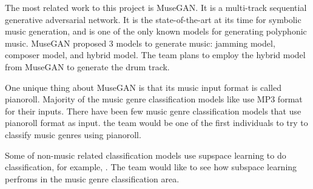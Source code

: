 \begin{par}
    \par\hspace{15pt} The most related work to this project is MuseGAN.\cite{musegan} It is a multi-track sequential generative adversarial network. It is the state-of-the-art at its time for symbolic music generation, and is one of the only known models for generating polyphonic music. MuseGAN proposed 3 models to generate music: jamming model, composer model, and hybrid model. The team plans to employ the hybrid model from MuseGAN to generate the drum track. 
\end{par}

\begin{par}
    \par One unique thing about MuseGAN is that its music input format is called pianoroll. Majority of the music genre classification models like \cite{tzanetakis2002musical} use MP3 format for their inputs. There have been few music genre classification models that use pianoroll format as input. the team would be one of the first individuals to try to classify music genres using pianoroll.    
\end{par}

\begin{par}
    \par Some of non-music related classification models use supspace learning to do classification, for example, \cite{pca}. The team would like to see how subspace learning perfroms in the music genre classification area.   
\end{par}
